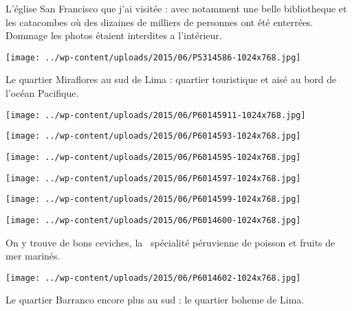  \pagebreak

L'église San Francisco que j'ai visitée : avec notamment une belle bibliotheque et les catacombes où des dizaines de milliers de personnes ont été enterrées. Dommage les photos étaient interdites a l'intérieur. 

\begin{center} \texttt{[image: ../wp-content/uploads/2015/06/P5314586-1024x768.jpg]} \end{center}

Le quartier Miraflores au sud de Lima : quartier touristique et aisé au bord de l'océan Pacifique. 

\begin{center} \texttt{[image: ../wp-content/uploads/2015/06/P60145911-1024x768.jpg]} \end{center}

\begin{center} \texttt{[image: ../wp-content/uploads/2015/06/P6014593-1024x768.jpg]} \end{center}

\begin{center} \texttt{[image: ../wp-content/uploads/2015/06/P6014595-1024x768.jpg]} \end{center}

\begin{center} \texttt{[image: ../wp-content/uploads/2015/06/P6014597-1024x768.jpg]} \end{center}

\begin{center} \texttt{[image: ../wp-content/uploads/2015/06/P6014599-1024x768.jpg]} \end{center}

\begin{center} \texttt{[image: ../wp-content/uploads/2015/06/P6014600-1024x768.jpg]} \end{center}

On y trouve de bons ceviches, \og la \fg\ spécialité péruvienne de poisson et fruits de mer marinés. 

\begin{center} \texttt{[image: ../wp-content/uploads/2015/06/P6014602-1024x768.jpg]} \end{center}
 
\pagebreak

Le quartier Barranco encore plus au sud : le quartier boheme de Lima. 

